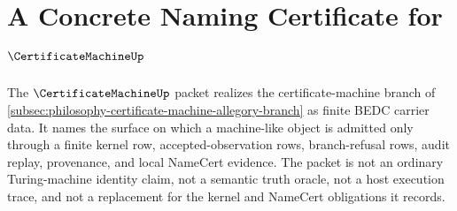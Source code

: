 \chapter{A Concrete Naming Certificate for $\CertificateMachineUp$}
\label{ch:concrete-instances-certificate-machine-namecert}

The $\CertificateMachineUp$ packet realizes the certificate-machine branch of \autoref{subsec:philosophy-certificate-machine-allegory-branch} as finite BEDC carrier data. It names the surface on which a machine-like object is admitted only through a finite kernel row, accepted-observation rows, branch-refusal rows, audit replay, provenance, and local NameCert evidence. The packet is not an ordinary Turing-machine identity claim, not a semantic truth oracle, not a host execution trace, and not a replacement for the kernel and NameCert obligations it records.


